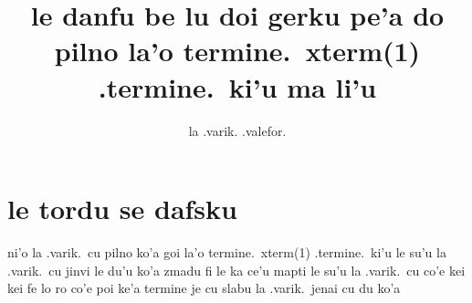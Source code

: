\documentclass{article}
\title{le danfu be lu doi gerku pe'a do pilno la'o termine.\ xterm(1) .termine.\ ki'u ma li'u}
\author{la .varik. .valefor.}
\begin{document}
\maketitle

\section{le tordu se dafsku}
ni'o la .varik.\ cu pilno ko'a goi la'o termine.\ xterm(1) .termine.\ ki'u le su'u la .varik.\ cu jinvi le du'u ko'a zmadu fi le ka ce'u mapti le su'u la .varik.\ cu co'e kei kei fe lo ro co'e poi ke'a termine je cu slabu la .varik.\ jenai cu du ko'a
\end{document}
